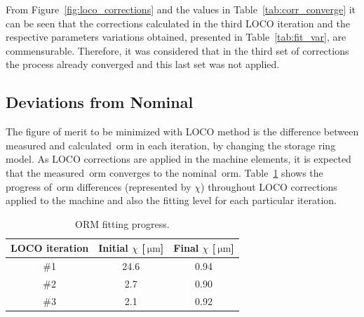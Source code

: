 From Figure~\ref{fig:loco_corrections} and the values in Table~\ref{tab:corr_converge} it can be seen that the corrections calculated in the third LOCO iteration and the respective parameters variations obtained, presented in Table~\ref{tab:fit_var}, are commensurable. Therefore, it was considered that in the third set of corrections the process already converged and this last set was not applied. 

\subsection{Deviations from Nominal}
The figure of merit to be minimized with LOCO method is the difference between measured and calculated~\gls{orm} in each iteration, by changing the storage ring model. As LOCO corrections are applied in the machine elements, it is expected that the measured~\gls{orm} converges to the nominal~\gls{orm}. Table~\ref{tab:orm_progress} shows the progress of~\gls{orm} differences (represented by $\chi$) throughout LOCO corrections applied to the machine and also the fitting level for each particular iteration.
\begin{table}
    \centering
    \caption{ORM fitting progress.}
    \label{tab:orm_progress}
    \begin{tabular}{ccc}
        \toprule\toprule
        LOCO iteration & Initial $\chi$ [$\SI{}{\micro\meter}$] & Final $\chi$ [$\SI{}{\micro\meter}$] \\
        \hline
        \#1 & 24.6 & 0.94 \\
        \#2 & 2.7 & 0.90 \\
        \#3 & 2.1 & 0.92 \\
        \bottomrule\bottomrule
    \end{tabular}
\end{table}

